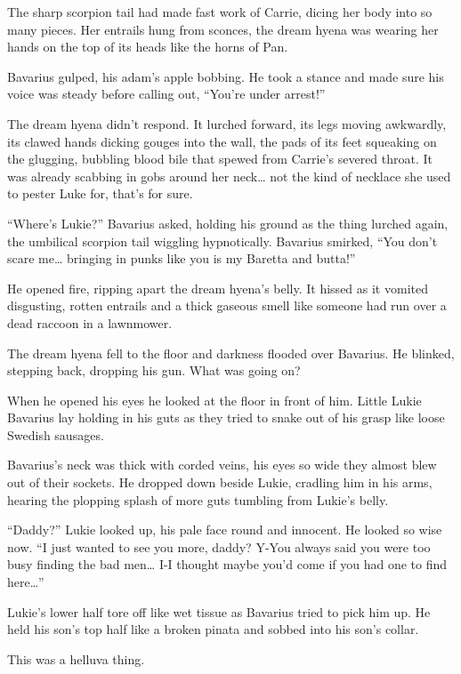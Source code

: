 The sharp scorpion tail had made fast work of Carrie, dicing her
body into so many pieces. Her entrails hung from sconces, the dream
hyena was wearing her hands on the top of its heads like the horns
of Pan.



Bavarius gulped, his adam's apple bobbing. He took a stance and
made sure his voice was steady before calling out, ``You're under
arrest!''



The dream hyena didn't respond. It lurched forward, its legs moving
awkwardly, its clawed hands dicking gouges into the wall, the pads
of its feet squeaking on the glugging, bubbling blood bile that
spewed from Carrie's severed throat. It was already scabbing in
gobs around her neck{\ldots} not the kind of necklace she used to pester
Luke for, that's for sure.



``Where's Lukie?'' Bavarius asked, holding his ground as the thing
lurched again, the umbilical scorpion tail wiggling hypnotically.
Bavarius smirked, ``You don't scare me{\ldots} bringing in punks like you
is my Baretta and butta!''



He opened fire, ripping apart the dream hyena's belly. It hissed as
it vomited disgusting, rotten entrails and a thick gaseous smell
like someone had run over a dead raccoon in a lawnmower.



The dream hyena fell to the floor and darkness flooded over
Bavarius. He blinked, stepping back, dropping his gun. What was
going on?



When he opened his eyes he looked at the floor in front of him.
Little Lukie Bavarius lay holding in his guts as they tried to
snake out of his grasp like loose Swedish sausages.



Bavarius's neck was thick with corded veins, his eyes so wide they
almost blew out of their sockets. He dropped down beside Lukie,
cradling him in his arms, hearing the plopping splash of more guts
tumbling from Lukie's belly.



``Daddy?'' Lukie looked up, his pale face round and innocent. He
looked so wise now. ``I just wanted to see you more, daddy? Y-You
always said you were too busy finding the bad men{\ldots} I-I thought
maybe you'd come if you had one to find here{\ldots}''



Lukie's lower half tore off like wet tissue as Bavarius tried to
pick him up. He held his son's top half like a broken pinata and
sobbed into his son's collar.



This was a helluva thing. 
 




